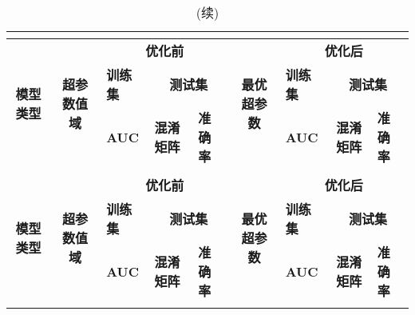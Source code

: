 \begin{landscape}
      \begin{longtable}{m{3cm}<{\centering}m{5cm}<{\centering}m{1cm}<{\centering}m{2cm}<{\centering}m{1cm}<{\centering}m{3cm}<{\centering}m{1cm}<{\centering}m{2cm}<{\centering}m{1cm}<{\centering}}
            \caption{超参数优化前后模型性能对比}\\
            \label{tab:super_para}\\
            \toprule
            \multicolumn{1}{c}{\multirow{3}{*}{\textbf{模型类型}}} & \multicolumn{1}{c}{\multirow{3}{*}{\textbf{超参数值域}}}    & \multicolumn{3}{c}{\textbf{优化前}}   & \multicolumn{1}{c}{\multirow{3}{*}{\textbf{最优超参数}}}   & \multicolumn{3}{c}{\textbf{优化后}} \\
            \multicolumn{1}{c}{} & \multicolumn{1}{c}{}     & \textbf{训练集} & \multicolumn{2}{c}{\textbf{测试集}} & \multicolumn{1}{c}{}   & \textbf{训练集} & \multicolumn{2}{c}{\textbf{测试集}}     \\
            \multicolumn{1}{c}{} & \multicolumn{1}{c}{}     & \textbf{AUC} & \textbf{混淆矩阵}    & \textbf{准确率} & \multicolumn{1}{c}{}    & \textbf{AUC} & \multicolumn{1}{c}{\textbf{混淆矩阵}}     & \textbf{准确率} \\
            \midrule
            \endfirsthead
            \caption[]{(续)}\\
            \midrule
            \multicolumn{1}{c}{\multirow{3}{*}{\textbf{模型类型}}} & \multicolumn{1}{c}{\multirow{3}{*}{\textbf{超参数值域}}}    & \multicolumn{3}{c}{\textbf{优化前}}   & \multicolumn{1}{c}{\multirow{3}{*}{\textbf{最优超参数}}}   & \multicolumn{3}{c}{\textbf{优化后}} \\
            \multicolumn{1}{c}{} & \multicolumn{1}{c}{}     & \textbf{训练集} & \multicolumn{2}{c}{\textbf{测试集}} & \multicolumn{1}{c}{}   & \textbf{训练集} & \multicolumn{2}{c}{\textbf{测试集}}     \\
            \multicolumn{1}{c}{} & \multicolumn{1}{c}{}     & \textbf{AUC} & \textbf{混淆矩阵}    & \textbf{准确率} & \multicolumn{1}{c}{}    & \textbf{AUC} & \multicolumn{1}{c}{\textbf{混淆矩阵}}     & \textbf{准确率} \\
            \endhead 
            \midrule
            \endfoot
            \bottomrule
            \endlastfoot

\end{longtable}
\end{landscape}
